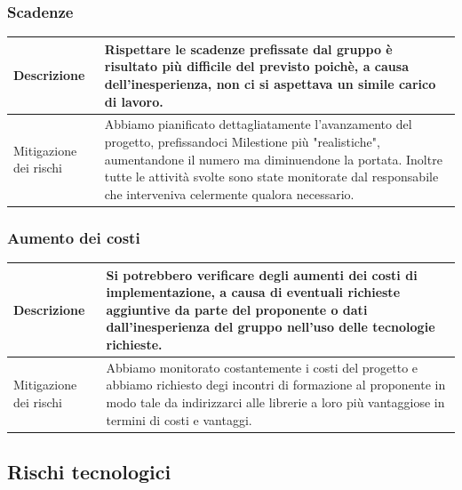 \documentclass{article}
\begin{document}
\subsubsection{Scadenze}
\begin{center}
\begin{tabular}{|P{10em} |P{20em}|} 
\hline
     Descrizione & Rispettare le scadenze prefissate dal gruppo è risultato più difficile del previsto poichè, a causa dell'inesperienza, non ci si aspettava un simile carico di lavoro. \\ 
     \hline
    Mitigazione dei rischi &  Abbiamo pianificato dettagliatamente l'avanzamento del progetto, prefissandoci Milestione più "realistiche", aumentandone il numero ma diminuendone la portata. Inoltre tutte le attività svolte sono state monitorate dal responsabile che interveniva celermente qualora necessario.\\
    \hline
\end{tabular}
\label{tab:mitscadenze}
\end{center}

\subsubsection{Aumento dei costi}
\begin{center}
\begin{tabular}{|P{10em} |P{20em}|}
\hline
     Descrizione &  Si potrebbero verificare degli aumenti dei costi di implementazione, a causa di eventuali richieste aggiuntive da parte del proponente o dati dall'inesperienza del gruppo nell'uso delle tecnologie richieste.\\ 
     \hline
    Mitigazione dei rischi &  Abbiamo monitorato costantemente i costi del progetto e abbiamo richiesto degi incontri di formazione al proponente in modo tale da indirizzarci alle librerie a loro più vantaggiose in termini di costi e vantaggi.\\
    \hline
\end{tabular}
\label{tab:mitcosti}
\end{center}


\subsection{Rischi tecnologici}
\end{document}
